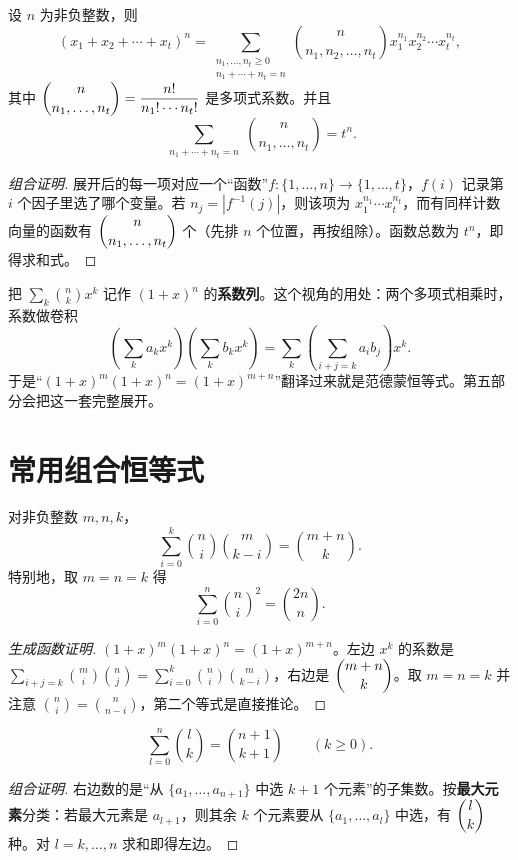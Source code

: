 \begin{theorem}[多项式定理]
设 $n$ 为非负整数，则
\[
(x_1+x_2+\cdots+x_t)^n
=\sum_{\substack{n_1,\ldots,n_t\ge0\\ n_1+\cdots+n_t=n}}
\binom{n}{n_1,n_2,\ldots,n_t}x_1^{n_1}x_2^{n_2}\cdots x_t^{n_t},
\]
其中 $\dbinom{n}{n_1,\ldots,n_t}=\dfrac{n!}{n_1!\cdots n_t!}$ 是多项式系数。并且
\[
\sum_{\substack{n_1+\cdots+n_t=n}}\binom{n}{n_1,\ldots,n_t}=t^n.
\]
\end{theorem}
\begin{proof}[组合证明]
展开后的每一项对应一个“函数”$f:\{1,\ldots,n\}\to\{1,\ldots,t\}$，$f(i)$ 记录第 $i$ 个因子里选了哪个变量。若 $n_j=|f^{-1}(j)|$，则该项为 $x_1^{n_1}\cdots x_t^{n_t}$，而有同样计数向量的函数有 $\dbinom{n}{n_1,\ldots,n_t}$ 个（先排 $n$ 个位置，再按组除）。函数总数为 $t^n$，即得求和式。
\end{proof}

\begin{tip}[生成函数视角]
把 $\sum_k\binom nk x^k$ 记作 $(1+x)^n$ 的\textbf{系数列}。这个视角的用处：两个多项式相乘时，系数做卷积
\[
\left(\sum_k a_kx^k\right)\left(\sum_k b_kx^k\right)=\sum_k\left(\sum_{i+j=k}a_ib_j\right)x^k.
\]
于是“$(1+x)^m(1+x)^n=(1+x)^{m+n}$”翻译过来就是范德蒙恒等式。第五部分会把这一套完整展开。
\end{tip}

\section{常用组合恒等式}
\begin{theorem}[范德蒙恒等式]
对非负整数 $m,n,k$，
\[
\sum_{i=0}^{k}\binom ni\binom m{k-i}=\binom{m+n}{k}.
\]
特别地，取 $m=n=k$ 得
\[
\sum_{i=0}^{n}\binom ni^2=\binom{2n}{n}.
\]
\end{theorem}
\begin{proof}[生成函数证明]
$(1+x)^m(1+x)^n=(1+x)^{m+n}$。左边 $x^k$ 的系数是 $\sum_{i+j=k}\binom mi\binom nj=\sum_{i=0}^{k}\binom ni\binom m{k-i}$，右边是 $\dbinom{m+n}{k}$。取 $m=n=k$ 并注意 $\binom ni=\binom n{n-i}$，第二个等式是直接推论。
\end{proof}

\begin{theorem}
\[
\sum_{l=0}^{n}\binom lk=\binom{n+1}{k+1}\qquad(k\ge0).
\]
\end{theorem}
\begin{proof}[组合证明]
右边数的是“从 $\{a_1,\ldots,a_{n+1}\}$ 中选 $k+1$ 个元素”的子集数。按\textbf{最大元素}分类：若最大元素是 $a_{l+1}$，则其余 $k$ 个元素要从 $\{a_1,\ldots,a_l\}$ 中选，有 $\dbinom lk$ 种。对 $l=k,\ldots,n$ 求和即得左边。
\end{proof}

